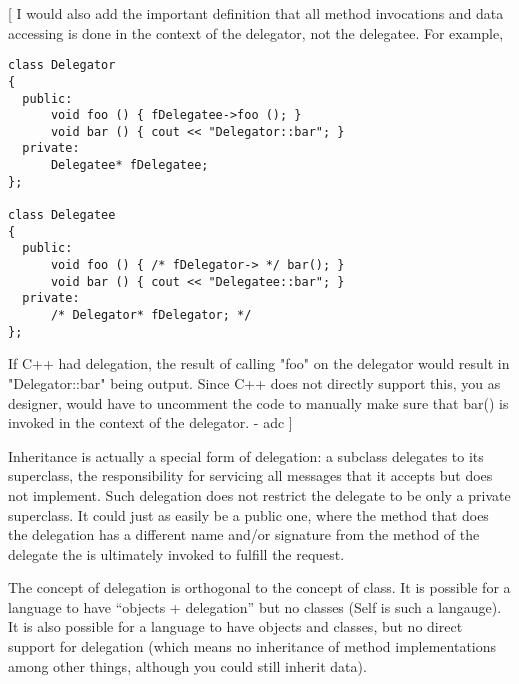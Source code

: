 \documentclass{book}
\begin{document}
[ I would also add the important definition that all method invocations and data accessing is done in the context of the
  delegator, not the delegatee. For example,
\begin{lstlisting}
class Delegator
{
  public:
      void foo () { fDelegatee->foo (); }
      void bar () { cout << "Delegator::bar"; }
  private:
      Delegatee* fDelegatee;
};

class Delegatee
{
  public:
      void foo () { /* fDelegator-> */ bar(); }
      void bar () { cout << "Delegatee::bar"; }
  private:
      /* Delegator* fDelegator; */
};
\end{lstlisting}
If C++ had delegation, the result of calling "foo" on the delegator would result in "Delegator::bar" being output. Since C++ does not directly support this, you
as designer, would have to uncomment the code to manually make sure that bar() is invoked in the context of the delegator.  - adc ]

Inheritance is actually a special form of delegation: a subclass delegates to its superclass, the responsibility for servicing all
messages that it accepts but does not implement. Such delegation does not restrict the delegate to be only a private superclass. It could
just as easily be a public one, where the method that does the delegation has a different name and/or signature from the method of
the delegate the is ultimately invoked to fulfill the request.

The concept of delegation is orthogonal to the concept of class.  It is possible for a language to have ``objects + delegation'' but no classes
(Self is such a langauge).  It is also possible for a language to have objects and classes, but no direct support for delegation (which means
no inheritance of method implementations among other things, although you could still inherit data).
\end{document}
